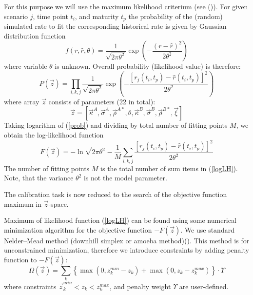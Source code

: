 \documentclass[10pt]{article}
\begin{document}
For this purpose we will use the maximum likelihood criterium (see (\citep{fisher1922})). For given scenario $j$, time point $t_i$, and maturity $t_p$ the probability of the (random) simulated rate to fit the corresponding historical rate is given by Gaussian distribution function
\begin{equation}
f(r,\hat r, \theta)= \frac{1}{\sqrt{2 \pi \theta^2}}\exp \left(  -\frac{(r-\hat r)^2}{2\theta^2} \right)
\end{equation}
where variable $\theta$ is unknown. 
Overall probability (likelihood value) is therefore:
\begin{equation}
\label{prob}
P(\vec z)=  \prod_{i,k,j}  \frac{1}{\sqrt{2 \pi \theta^2}} \exp \left(  -\frac{\left[r_j(t_i,t_p)-\hat r(t_i,t_p)\right]^2}{2\theta^2} \right)
\end{equation}
where array $\vec z$ consists of parameters (22 in total):
\begin{equation}
\label{z}
\vec z = \left[ \vec \kappa^A, \vec \sigma^A, \vec \rho^{A*} , \theta ,  \vec \kappa^B, \vec \sigma^B, \vec \rho^{B*} , \vec \xi  \right]
\end{equation}
Taking logarithm of (\ref{prob}) and dividing by total number of fitting points $M$, we obtain the log-likelihood  function 
\begin{equation}
\label{logLH}
F(\vec z)= -\ln {\sqrt{2 \pi \theta^2} }- \frac{1}{M}\sum_{i,k,j}     \frac{\left[r_j(t_i,t_p)-\hat r(t_i,t_p)\right]^2}{2\theta^2} 
\end{equation}
The number of fitting points $M$ is the total number of sum items in (\ref{logLH}). Note, that the variance $\theta^2$ is not the model parameter.

The calibration task is now reduced to the search of the objective function maximum in $\vec z$-space.

Maximum of likelihood function (\ref{logLH}) can be found using some numerical minimization algorithm for the objective function $-F(\vec z)$. We use standard Nelder–Mead method (downhill simplex or amoeba method)(\citep{aldrich}). This method is for unconstrained minimization, therefore we introduce constraints by adding penalty function to $-F(\vec z)$:
\begin{equation}
\label{penalty}
\Omega(\vec z)= \sum_k \left\{ \max (0, z_k^{min} - z_k) + \max (0,z_k - z_k^{max}) \right\}\cdot \Upsilon
\end{equation}
where constraints $\vec z_k^{min} < z_k < z_k^{max}$,  and penalty weight $\Upsilon$ are user-defined.
\end{document}

